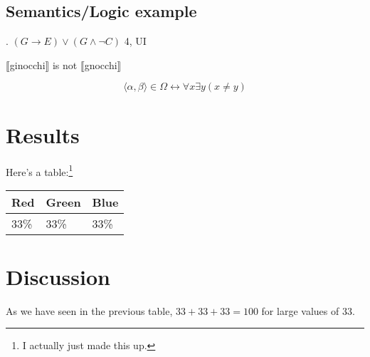 \documentclass[11pt]{article}
\begin{document}
\begin{spacing}{1.2}
\subsection{Semantics/Logic example}
\ex. $ (G \rightarrow E) \lor (G \land \neg C)  $ \hfill 4, UI

$\llbracket$ginocchi$\rrbracket$ is not $\llbracket$gnocchi$\rrbracket$ 

$$\langle \alpha , \beta \rangle \in \Omega \leftrightarrow \forall x \exists y ( x \neq y ) $$


\section*{Results}
Here's a table:\footnote{I actually just made this up.}

\begin{center}

\begin{tabular}{|l|l|l|}
\hline
Red  &  Green  &  Blue \\
\hline
\hline
33\% &  33\%   &  33\% \\
\hline
\end{tabular}

\end{center}


\section{Discussion}
As we have seen in the previous table, $ 33 + 33 + 33 = 100$ for large values of 33.


\end{spacing}
%
\end{document}
